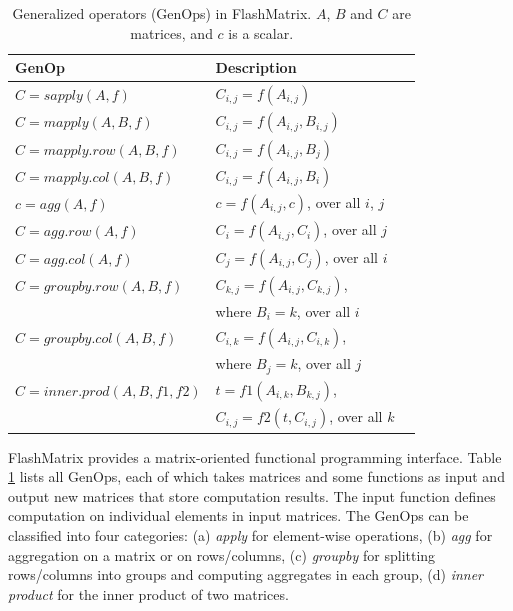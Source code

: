 \begin{table}
\begin{center}
\footnotesize
\begin{tabular}{|l|l|l|}
\hline
GenOp & Description \\
\hline
$C=sapply(A, f)$ & $C_{i,j}=f(A_{i,j})$ \\
\hline
$C=mapply(A, B, f)$ & $C_{i,j}=f(A_{i,j}, B_{i,j})$ \\
\hline
$C=mapply.row(A, B, f)$ & $C_{i,j}=f(A_{i,j}, B_j)$ \\
\hline
$C=mapply.col(A, B, f)$ & $C_{i,j}=f(A_{i,j}, B_i)$ \\
\hline
$c=agg(A, f)$ & $c=f(A_{i,j}, c)$, over all $i$, $j$ \\
\hline
$C=agg.row(A, f)$ & $C_i=f(A_{i,j}, C_i)$, over all $j$ \\
\hline
$C=agg.col(A, f)$ & $C_j=f(A_{i,j}, C_j)$, over all $i$ \\
\hline
$C=groupby.row(A, B, f)$ & $C_{k,j}=f(A_{i,j}, C_{k,j})$,\\ & where $B_i=k$, over all $i$ \\
\hline
$C=groupby.col(A, B, f)$ & $C_{i,k}=f(A_{i,j}, C_{i,k})$,\\ & where $B_j=k$, over all $j$ \\
\hline
$C=inner.prod(A, B, f1, f2)$ & $t=f1(A_{i,k}, B_{k,j})$,
\\ & $C_{i,j}=f2(t, C_{i,j})$, over all $k$ \\
\hline
\end{tabular}
\normalsize
\end{center}
\vspace{-12pt}
\caption{Generalized operators (GenOps) in FlashMatrix.
$A$, $B$ and $C$ are matrices, and $c$ is a scalar.}
\label{tbl:genops}
\vspace{-10pt}
\end{table}

FlashMatrix provides a matrix-oriented functional programming interface.
Table \ref{tbl:genops} lists all GenOps, each of which takes matrices and
some functions as input and output new matrices that store computation results.
The input function defines computation on individual elements in input matrices.
The GenOps can be classified into four categories: (a) \textit{apply} for
element-wise operations, (b) \textit{agg} for aggregation on a matrix
or on rows/columns, (c) \textit{groupby} for splitting rows/columns
into groups and computing aggregates in each group,
(d) \textit{inner product} for the inner product of two matrices.

